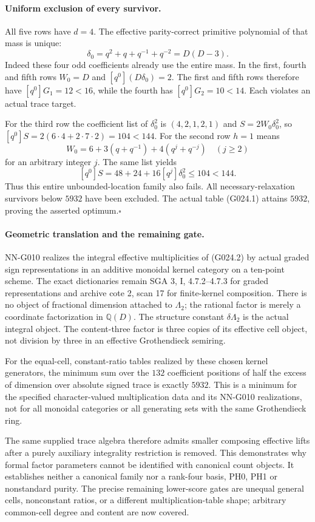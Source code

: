 \paragraph{Uniform exclusion of every survivor.}
All five rows have $d=4$. The effective parity-correct
primitive polynomial of that mass is unique:
\[
 \delta_0=q^2+q+q^{-1}+q^{-2}=D(D-3).
\]
Indeed these four odd coefficients already use the entire
mass. In the first, fourth and fifth rows $W_0=D$ and
$[q^0](D\delta_0)=2$. The first and fifth rows therefore
have $[q^0]G_1=12<16$, while the fourth has
$[q^0]G_2=10<14$. Each violates an actual trace target.

For the third row the coefficient list of $\delta_0^2$
is $(4,2,1,2,1)$ and $S=2W_0\delta_0^2$, so
$[q^0]S=2(6\cdot4+2\cdot7\cdot2)=104<144$.
For the second row $h=1$ means
\[
 W_0=6+3(q+q^{-1})+4(q^j+q^{-j})\quad(j\ge2)
\]
for an arbitrary integer $j$. The same list yields
\[
 [q^0]S=48+24+16[q^j]\delta_0^2\le104<144.
\]
Thus this entire unbounded-location family also fails.
All necessary-relaxation survivors below $5932$ have
been excluded. The actual table (G024.1) attains $5932$,
proving the asserted optimum.\hfill$\square$

\paragraph{Geometric translation and the remaining gate.}
NN-G010 realizes the integral effective multiplicities of
(G024.2) by actual graded sign representations in an
additive monoidal kernel category on a ten-point scheme.
The exact dictionaries remain SGA 3, I, 4.7.2--4.7.3
for graded representations and archive cote 2, scan 17
for finite-kernel composition. There is no object of
fractional dimension attached to $\Lambda_2$; the rational
factor is merely a coordinate factorization in $\mathbb Q(D)$.
The structure constant $\delta\Lambda_2$ is the actual
integral object. The content-three factor is three copies
of its effective cell object, not division by three in
an effective Grothendieck semiring.

For the equal-cell, constant-ratio tables realized by these
chosen kernel generators, the minimum sum over the $132$
coefficient positions of half the excess of dimension over
absolute signed trace is exactly $5932$. This is a minimum
for the specified character-valued multiplication data and
its NN-G010 realizations, not for all monoidal categories
or all generating sets with the same Grothendieck ring.

The same supplied trace algebra therefore admits smaller
composing effective lifts after a purely auxiliary
integrality restriction is removed. This demonstrates
why formal factor parameters cannot be identified with
canonical count objects. It establishes neither a
canonical family nor a rank-four basis, PH0, PH1 or
nonstandard purity. The precise remaining lower-score
gates are unequal general cells, nonconstant ratios,
or a different multiplication-table shape; arbitrary
common-cell degree and content are now covered.

